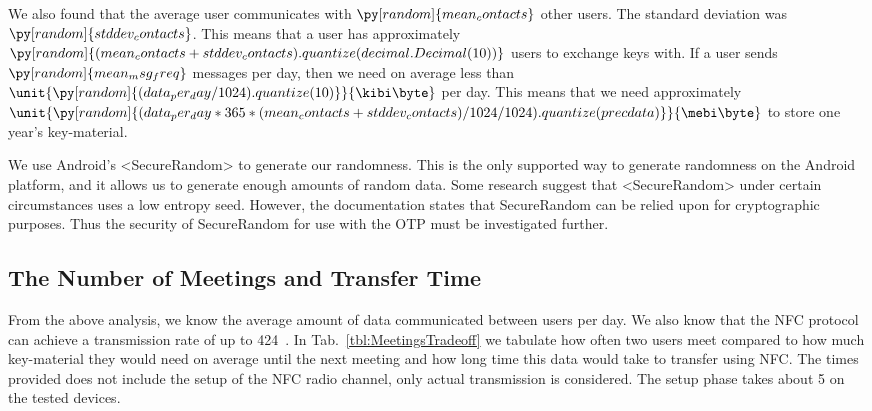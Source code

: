 We also found that the average user communicates with
\(\py[random]{mean_contacts}\)
other users.
The standard deviation was
\(\py[random]{stddev_contacts}\).
This means that a user has approximately
\(\py[random]{(mean_contacts 
+ stddev_contacts).quantize(decimal.Decimal(10))}\)
users to exchange keys with.
\reversemarginpar
{}
\reversemarginpar
If a user sends
\(\py[random]{mean_msg_freq}\)
messages per day, then we need on average less than
\(\unit{\py[random]{(data_per_day/1024).quantize( 10 )}}{\kibi\byte}\)
per day.
This means that we need approximately
\(\unit{\py[random]{(data_per_day*365*(mean_contacts+stddev_contacts)/1024/1024).quantize( 
precdata )}}{\mebi\byte}\) to store one year's key-material.


We use Android's <SecureRandom> to generate our randomness.
This is the only supported way to generate randomness on the Android platform, 
and it allows us to generate enough amounts of random data.
Some research \cite{AndroidLowEntropyMyth,JavaRandomness} suggest that 
<SecureRandom> under certain circumstances uses a low entropy seed.
However, the documentation states that SecureRandom can be relied upon for 
cryptographic purposes.
Thus the security of SecureRandom for use with the \ac{OTP} must be 
investigated further.

\subsection{The Number of Meetings and Transfer Time}
\label{sec:Meetings}
From the above analysis, we know the average amount of data communicated 
between users per day.
We also know that the \ac{NFC} protocol can achieve a transmission rate of up 
to \unit{424}{\kilo\bit\per\second}~\cite{NFCController}.
In Tab.~\ref{tbl:MeetingsTradeoff} we tabulate how often two users meet 
compared to how much key-material they would need on average until the next 
meeting and how long time this data would take to transfer using \ac{NFC}.
The times provided does not include the setup of the \ac{NFC} radio channel, 
only actual transmission is considered. The setup phase takes about 
\unit{5}{\second} on the tested devices.

